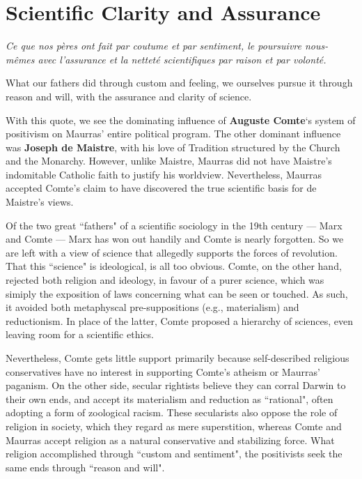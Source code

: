 \section{Scientific Clarity and Assurance}

\begin{quotex}
\textit{Ce que nos pères ont fait par coutume et par sentiment, le poursuivre nous-mêmes avec l'assurance et la netteté scientifiques par raison et par volonté.}

What our fathers did through custom and feeling, we ourselves pursue it through reason and will, with the assurance and clarity of science. 

\end{quotex}
With this quote, we see the dominating influence of \textbf{Auguste Comte}`s system of positivism on Maurras' entire political program. The other dominant influence was \textbf{Joseph de Maistre}, with his love of Tradition structured by the Church and the Monarchy. However, unlike Maistre, Maurras did not have Maistre's indomitable Catholic faith to justify his worldview. Nevertheless, Maurras accepted Comte's claim to have discovered the true scientific basis for de Maistre's views.

Of the two great ``fathers" of a scientific sociology in the 19th century — Marx and Comte — Marx has won out handily and Comte is nearly forgotten. So we are left with a view of science that allegedly supports the forces of revolution. That this ``science" is ideological, is all too obvious. Comte, on the other hand, rejected both religion and ideology, in favour of a purer science, which was simiply the exposition of laws concerning what can be seen or touched. As such, it avoided both metaphyscal pre-suppositions (e.g., materialism) and reductionism. In place of the latter, Comte proposed a hierarchy of sciences, even leaving room for a scientific ethics.

Nevertheless, Comte gets little support primarily because self-described religious conservatives have no interest in supporting Comte's atheism or Maurras' paganism. On the other side, secular rightists believe they can corral Darwin to their own ends, and accept its materialism and reduction as ``rational", often adopting a form of zoological racism. These secularists also oppose the role of religion in society, which they regard as mere superstition, whereas Comte and Maurras accept religion as a natural conservative and stabilizing force. What religion accomplished through ``custom and sentiment", the positivists seek the same ends through ``reason and will".



